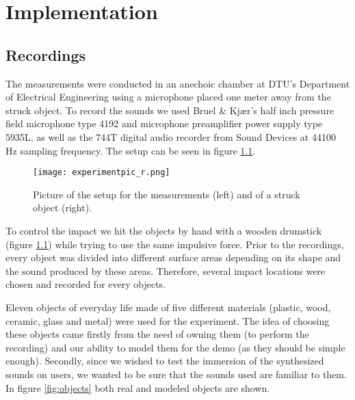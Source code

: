 \chapter{Implementation}\label{ch:implementation}


%

\section{Recordings}\label{sec:recordings}

The measurements were conducted in an anechoic chamber at DTU's Department of Electrical Engineering using a microphone placed one meter away from the struck object. To record the sounds we used Bruel \& Kjær's half inch pressure field microphone type 4192 and microphone preamplifier power supply type 5935L, as well as the 744T digital audio recorder from Sound Devices at 44100 Hz sampling frequency. The setup can be seen in figure \ref{fig:experiment}.

\begin{figure}[H]
  \centering
    \texttt{[image: experimentpic\_r.png]}
      \caption{Picture of the setup for the measurements (left) and of a struck object (right).}\label{fig:experiment}
\end{figure}

To control the impact we hit the objects by hand with a wooden drumstick (figure \ref{fig:experiment}) while trying to use the same impulsive force. Prior to the recordings, every object was divided into different surface areas depending on its shape and the sound produced by these areas. Therefore, several impact locations were chosen and recorded for every objects.

Eleven objects of everyday life made of five different materials (plastic, wood, ceramic, glass and metal) were used for the experiment. The idea of choosing these objects came firstly from the need of owning them (to perform the recording) and our ability to model them for the demo (as they should be simple enough). Secondly, since we wished to test the immersion of the synthesized sounds on users, we wanted to be sure that the sounds used are familiar to them. In figure \ref{fig:objects} both real and modeled objects are shown. 

